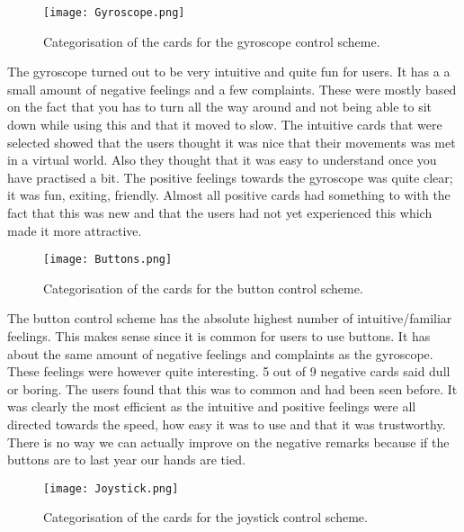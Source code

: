 \begin{figure}[H]
\centering
\texttt{[image: Gyroscope.png]}
\caption{Categorisation of the cards for the gyroscope control scheme.}
\end{figure}

The gyroscope turned out to be very intuitive and quite fun for users. It has a a small amount of negative feelings and a few complaints. These were mostly based on the fact that you has to turn all the way around and not being able to sit down while using this and that it moved to slow. 
The intuitive cards that were selected showed that the users thought it was nice that their movements was met in a virtual world. Also they thought that it was easy to understand once you have practised a bit. 
The positive feelings towards the gyroscope was quite clear; it was fun, exiting, friendly. Almost all positive cards had something to with the fact that this was new and that the users had not yet experienced this which made it more attractive.

\begin{figure}[H]
\centering
\texttt{[image: Buttons.png]}
\caption{Categorisation of the cards for the button control scheme.}
\end{figure}

The button control scheme has the absolute highest number of intuitive/familiar feelings. This makes sense since it is common for users to use buttons. 
It has about the same amount of negative feelings and complaints as the gyroscope. These feelings were however quite interesting. 5 out of 9 negative cards said dull or boring. The users found that this was to common and had been seen before. It was clearly the most efficient as the intuitive and positive feelings were all directed towards the speed, how easy it was to use and that it was trustworthy. 
There is no way we can actually improve on the negative remarks because if the buttons are to last year our hands are tied.

\begin{figure}[H]
\centering
\texttt{[image: Joystick.png]}
\caption{Categorisation of the cards for the joystick control scheme.}
\end{figure}

